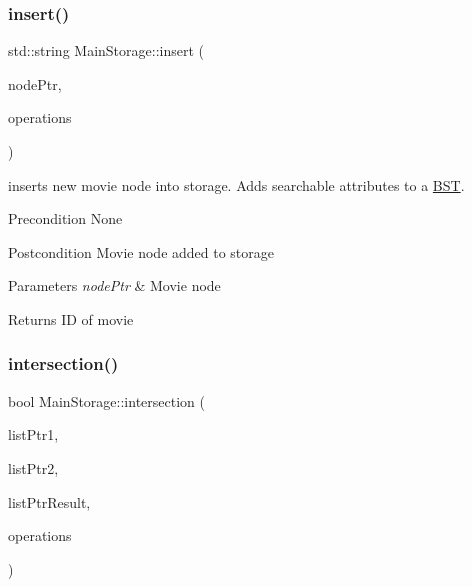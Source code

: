 \subsubsection{\texorpdfstring{insert()}{insert()}\hspace{0.1cm}{\footnotesize\ttfamily [2/2]}}
{\footnotesize\ttfamily std\+::string Main\+Storage\+::insert (\begin{DoxyParamCaption}\item[{\hyperlink{class_main_storage_node}{Main\+Storage\+Node} $\ast$}]{node\+Ptr,  }\item[{unsigned int \&}]{operations }\end{DoxyParamCaption})}

inserts new movie node into storage. Adds searchable attributes to a \hyperlink{class_b_s_t}{B\+ST}. \begin{DoxyPrecond}{Precondition}
None 
\end{DoxyPrecond}
\begin{DoxyPostcond}{Postcondition}
Movie node added to storage 
\end{DoxyPostcond}

\begin{DoxyParams}{Parameters}
{\em node\+Ptr} & Movie node \\
\hline
\end{DoxyParams}
\begin{DoxyReturn}{Returns}
ID of movie 
\end{DoxyReturn}
\mbox{\label{class_main_storage_abb808b8d737244bae19a33ae3888a1d3}} 
\subsubsection{\texorpdfstring{intersection()}{intersection()}}
{\footnotesize\ttfamily bool Main\+Storage\+::intersection (\begin{DoxyParamCaption}\item[{\hyperlink{class_list}{List}$<$ \hyperlink{class_main_storage_node}{Main\+Storage\+Node} $\ast$$>$ $\ast$}]{list\+Ptr1,  }\item[{\hyperlink{class_list}{List}$<$ \hyperlink{class_main_storage_node}{Main\+Storage\+Node} $\ast$$>$ $\ast$}]{list\+Ptr2,  }\item[{\hyperlink{class_list}{List}$<$ \hyperlink{class_main_storage_node}{Main\+Storage\+Node} $\ast$$>$ $\ast$}]{list\+Ptr\+Result,  }\item[{unsigned int \&}]{operations }\end{DoxyParamCaption})\hspace{0.3cm}{\ttfamily [static]}}


